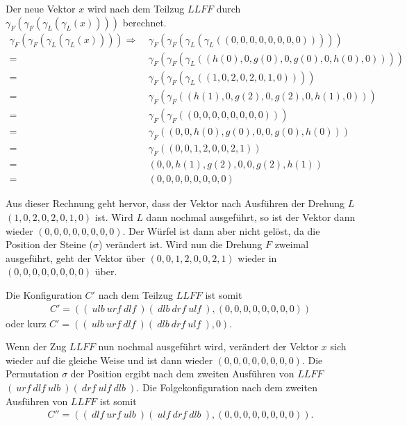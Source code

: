 \documentclass[12pt,a4paper, usenames, dvipsnames]{article}
\theoremstyle{mystyle}
\theoremstyle{definition}
\begin{document}
Der neue Vektor $x$ wird nach dem Teilzug $LLFF$ durch $\gamma_F(\gamma_F(\gamma_L(\gamma_L(x))))$ berechnet. 
\begin{align*}
 \gamma_F(\gamma_F(\gamma_L(\gamma_L(x)))) \Rightarrow \ & \gamma_F(\gamma_F(\gamma_L(\gamma_L((0,0,0,0,0,0,0,0))))) \\
= \ & \gamma_F(\gamma_F(\gamma_L((h(0),0,g(0),0,g(0),0,h(0),0)))) \\
= \ & \gamma_F(\gamma_F(\gamma_L((1,0,2,0,2,0,1,0)))) \\
= \ & \gamma_F(\gamma_F((h(1),0,g(2),0,g(2),0,h(1),0))) \\
= \ & \gamma_F(\gamma_F((0,0,0,0,0,0,0,0))) \\
= \ & \gamma_F((0,0,h(0),g(0),0,0,g(0),h(0))) \\
= \ & \gamma_F((0,0,1,2,0,0,2,1)) \\
= \ & (0,0,h(1),g(2),0,0,g(2),h(1)) \\
= \ & (0,0,0,0,0,0,0,0)
\end{align*}

Aus dieser Rechnung geht hervor, dass der Vektor nach Ausführen der Drehung $L$ $(1,0,2,0,2,0,1,0)$ ist. Wird $L$ dann nochmal ausgeführt, so ist der Vektor dann wieder $(0,0,0,0,0,0,0,0)$. Der Würfel ist dann aber nicht gelöst, da die Position der Steine ($\sigma$) verändert ist.
Wird nun die Drehung $F$ zweimal ausgeführt, geht der Vektor über $(0,0,1,2,0,0,2,1)$ wieder in  $(0,0,0,0,0,0,0,0)$ über. 

Die Konfiguration $C'$ nach dem Teilzug $LLFF$ ist somit 
\begin{align*}
C' = ((\ \textit{ulb} \ \textit{urf} \ \textit{dlf} \ )(\ \textit{dlb} \ \textit{drf} \ \textit{ulf} \ ),(0,0,0,0,0,0,0,0))
\end{align*} 
oder kurz $C' = ((\ \textit{ulb} \ \textit{urf} \ \textit{dlf} \ )(\ \textit{dlb} \ \textit{drf} \ \textit{ulf} \ ),0)$.

Wenn der Zug $LLFF$ nun nochmal ausgeführt wird, verändert der Vektor $x$ sich wieder auf die gleiche Weise und ist dann wieder $(0,0,0,0,0,0,0,0)$. Die Permutation $\sigma$ der Position ergibt nach dem zweiten Ausführen von $LLFF$ $(\ \textit{urf} \ \textit{dlf} \ \textit{ulb} \ )(\ \textit{drf} \ \textit{ulf} \ \textit{dlb} \ )$. Die Folgekonfiguration nach dem zweiten Ausführen von $LLFF$ ist somit 
\begin{align*}
C'' = ((\ \textit{dlf} \ \textit{urf} \ \textit{ulb} \ )(\ \textit{ulf} \ \textit{drf} \ \textit{dlb} \ ),(0,0,0,0,0,0,0,0)).
\end{align*} 
\end{document}
